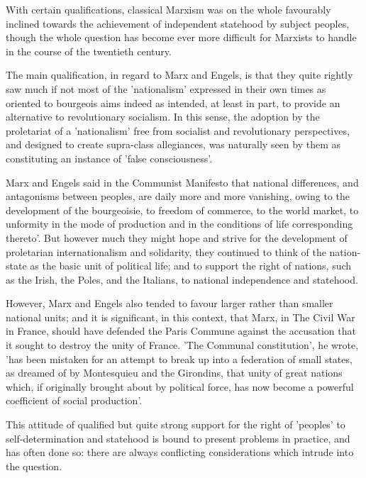 With certain qualifications, classical Marxism was on the whole favourably inclined towards the achievement of independent statehood by subject peoples, though the whole question has become ever more difficult for Marxists to handle in the course of the twentieth century.

The main qualification, in regard to Marx and Engels, is that they quite rightly saw much if not most of the 'nationalism' expressed in their own times as oriented to bourgeois aims indeed as intended, at least in part, to provide an alternative to revolutionary socialism. In this sense, the adoption by the proletariat of a 'nationalism' free from socialist and revolutionary perspectives, and designed to create supra-class allegiances, was naturally seen by them as constituting an instance of 'false consciousness'.

Marx and Engels said in the Communist Manifesto that national differences, and antagonisms between peoples, are daily more and more vanishing, owing to the development of the bourgeoisie, to freedom of commerce, to the world market, to unformity in the mode of production and in the conditions of life corresponding thereto'. But however much they might hope and strive for the development of proletarian internationalism and solidarity, they continued to think of the nation-state as the basic unit of political life; and to support the right of nations, such as the Irish, the Poles, and the Italians, to national independence and statehood.

However, Marx and Engels also tended to favour larger rather than smaller national units; and it is significant, in this context, that Marx, in The Civil War in France, should have defended the Paris Commune against the accusation that it sought to destroy the unity of France. 'The Communal constitution', he wrote, 'has been mistaken for an attempt to break up into a federation of small states, as dreamed of by Montesquieu and the Girondins, that unity of great nations which, if originally brought about by political force, has now become a powerful coefficient of social production'.

This attitude of qualified but quite strong support for the right of 'peoples' to self-determination and statehood is bound to present problems in practice, and has often done so: there are always conflicting considerations which intrude into the question.

